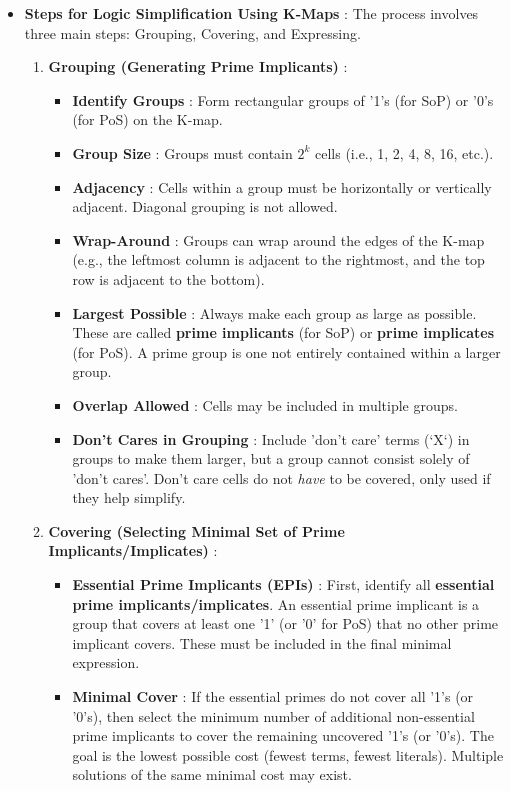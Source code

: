 \documentclass{article}
\begin{document}
\begin{itemize}
\begin{itemize}
    \item \textbf{Steps for Logic Simplification Using K-Maps} : The process involves three main steps: Grouping, Covering, and Expressing.
    \begin{enumerate}
        \item \textbf{Grouping (Generating Prime Implicants)} :
        \begin{itemize}
            \item \textbf{Identify Groups} : Form rectangular groups of '1's (for SoP) or '0's (for PoS) on the K-map.
            \item \textbf{Group Size} : Groups must contain $2^k$ cells (i.e., 1, 2, 4, 8, 16, etc.).
            \item \textbf{Adjacency} : Cells within a group must be horizontally or vertically adjacent. Diagonal grouping is not allowed.
            \item \textbf{Wrap-Around} : Groups can wrap around the edges of the K-map (e.g., the leftmost column is adjacent to the rightmost, and the top row is adjacent to the bottom).
            \item \textbf{Largest Possible} : Always make each group as large as possible. These are called \textbf{prime implicants} (for SoP) or \textbf{prime implicates} (for PoS). A prime group is one not entirely contained within a larger group.
            \item \textbf{Overlap Allowed} : Cells may be included in multiple groups.
            \item \textbf{Don't Cares in Grouping} : Include 'don't care' terms (`X`) in groups to make them larger, but a group cannot consist solely of 'don't cares'. Don't care cells do not \textit{have} to be covered, only used if they help simplify.
        \end{itemize}
        \item \textbf{Covering (Selecting Minimal Set of Prime Implicants/Implicates)} :
        \begin{itemize}
            \item \textbf{Essential Prime Implicants (EPIs)} : First, identify all \textbf{essential prime implicants/implicates}. An essential prime implicant is a group that covers at least one '1' (or '0' for PoS) that no other prime implicant covers. These must be included in the final minimal expression.
            \item \textbf{Minimal Cover} : If the essential primes do not cover all '1's (or '0's), then select the minimum number of additional non-essential prime implicants to cover the remaining uncovered '1's (or '0's). The goal is the lowest possible cost (fewest terms, fewest literals). Multiple solutions of the same minimal cost may exist.

\end{itemize}
\end{enumerate}
\end{itemize}
\end{itemize}
\end{document}
